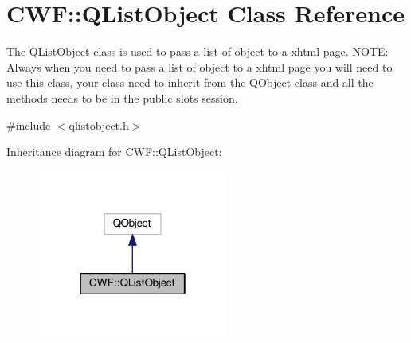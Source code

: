 \hypertarget{class_c_w_f_1_1_q_list_object}{\section{C\+W\+F\+:\+:Q\+List\+Object Class Reference}
\label{class_c_w_f_1_1_q_list_object}
}


The \hyperlink{class_c_w_f_1_1_q_list_object}{Q\+List\+Object} class is used to pass a list of object to a xhtml page. N\+O\+T\+E\+: Always when you need to pass a list of object to a xhtml page you will need to use this class, your class need to inherit from the Q\+Object class and all the methods needs to be in the public slots session.  




{\ttfamily \#include $<$qlistobject.\+h$>$}



Inheritance diagram for C\+W\+F\+:\+:Q\+List\+Object\+:\nopagebreak
\begin{figure}[H]
\begin{center}
\leavevmode
\includegraphics[width=178pt]{class_c_w_f_1_1_q_list_object__inherit__graph}
\end{center}
\end{figure}
